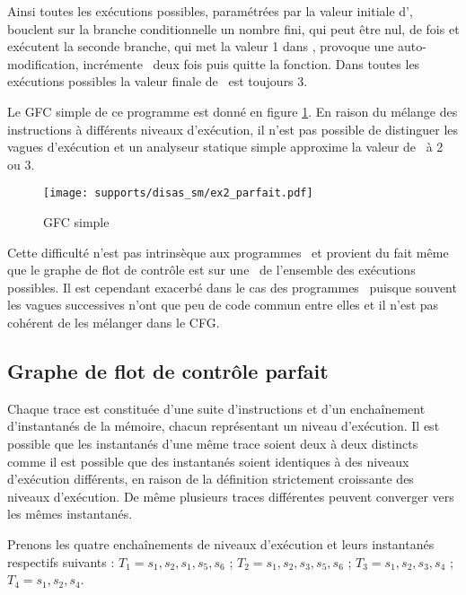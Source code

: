 Ainsi toutes les exécutions possibles, paramétrées par la valeur initiale d'\eax, bouclent sur la branche conditionnelle un nombre fini, qui peut être nul, de fois et exécutent la seconde branche, qui met la valeur 1 dans \edi, provoque une auto-modification, incrémente \edi\ deux fois puis quitte la fonction. Dans toutes les exécutions possibles la valeur finale de \edi\ est toujours 3.

Le GFC simple de ce programme est donné en figure \ref{fig:sm_cfg_parfait}. En raison du mélange des instructions à différents niveaux d'exécution, il n'est pas possible de distinguer les vagues d'exécution et un analyseur statique simple approxime la valeur de \edi\ à 2 ou 3.

\begin{figure}[h]
\begin{center}
  \texttt{[image: supports/disas\_sm/ex2\_parfait.pdf]}
\end{center}
\caption{GFC simple}
\label{fig:sm_cfg_parfait}
\end{figure}



Cette difficulté n'est pas intrinsèque aux programmes \sm\ et provient du fait même que le graphe de flot de contrôle est sur une \sura\ de l'ensemble des exécutions possibles. Il est cependant exacerbé dans le cas des programmes \sm\ puisque souvent les vagues successives n'ont que peu de code commun entre elles et il n'est pas cohérent de les mélanger dans le CFG.

\FloatBarrier
\subsection{Graphe de flot de contrôle parfait\label{sec:gfc_parfait}}

Chaque trace est constituée d'une suite d'instructions et d'un enchaînement d'instantanés de la mémoire, chacun représentant un niveau d'exécution.
Il est possible que les instantanés d'une même trace soient deux à deux distincts comme il est possible que des instantanés soient identiques à des niveaux d'exécution différents, en raison de la définition strictement croissante des niveaux d'exécution.
De même plusieurs traces différentes peuvent converger vers les mêmes instantanés.

Prenons les quatre enchaînements de niveaux d'exécution et leurs instantanés respectifs suivants :
$T_1 = s_1, s_2, s_1, s_5, s_6$ ; 
$T_2 = s_1, s_2, s_3, s_5, s_6$ ; 
$T_3 = s_1, s_2, s_3, s_4$ ; 
$T_4 = s_1, s_2, s_4$.

